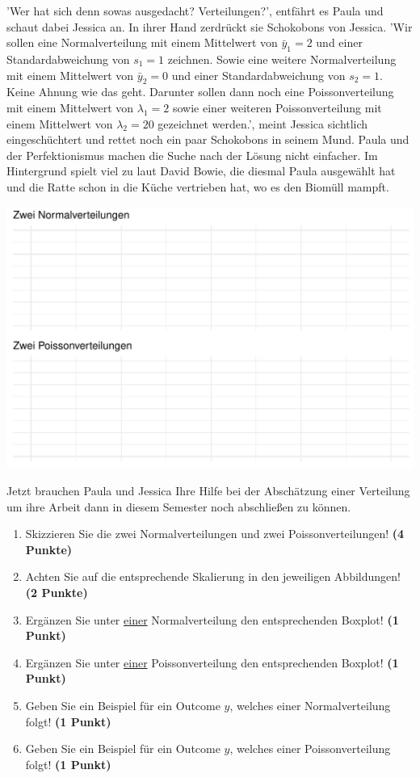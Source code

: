 \documentclass[a4paper, 9pt]{scrartcl}\usepackage[]{graphicx}\usepackage[]{xcolor}
\makeatletter
\def\maxwidth{ %
  \ifdim\Gin@nat@width>\linewidth
    \linewidth
  \else
    \Gin@nat@width
  \fi
}
\makeatother
\begin{document}
'Wer hat sich denn sowas ausgedacht? Verteilungen?', entfährt es Paula und schaut dabei Jessica an. In ihrer Hand zerdrückt sie Schokobons von Jessica. 'Wir sollen eine Normalverteilung mit einem Mittelwert von $\bar{y}_1 = 2$ und einer Standardabweichung von $s_1 = 1$ zeichnen. Sowie eine weitere Normalverteilung mit einem Mittelwert von $\bar{y}_2 = 0$ und einer Standardabweichung von $s_2 = 1$. Keine Ahnung wie das geht. Darunter sollen dann noch eine Poissonverteilung mit einem Mittelwert von $\lambda_1 = 2$ sowie einer weiteren Poissonverteilung mit einem Mittelwert von $\lambda_2 = 20$ gezeichnet werden.', meint Jessica sichtlich eingeschüchtert und rettet noch ein paar Schokobons in seinem Mund. Paula und der Perfektionismus machen die Suche nach der Lösung nicht einfacher. Im Hintergrund spielt viel zu laut David Bowie, die diesmal Paula ausgewählt hat und die Ratte schon in die Küche vertrieben hat, wo es den Biomüll mampft.\\




{\centering \includegraphics[width=\maxwidth]{img/histogram-01-1} 

}




Jetzt brauchen Paula und Jessica Ihre Hilfe bei der Abschätzung einer Verteilung um ihre Arbeit dann in diesem Semester noch abschließen zu können.


\begin{enumerate}
\item Skizzieren Sie die zwei Normalverteilungen und zwei Poissonverteilungen! \textbf{(4 Punkte)}
\item Achten Sie auf die entsprechende Skalierung in den jeweiligen Abbildungen! \textbf{(2 Punkte)}
\item Ergänzen Sie unter \underline{einer} Normalverteilung den entsprechenden Boxplot! \textbf{(1 Punkt)}
\item Ergänzen Sie unter \underline{einer} Poissonverteilung den entsprechenden Boxplot! \textbf{(1 Punkt)}
\item Geben Sie ein Beispiel für ein Outcome $y$, welches einer Normalverteilung folgt! \textbf{(1 Punkt)}
\item Geben Sie ein Beispiel für ein Outcome $y$, welches einer Poissonverteilung folgt! \textbf{(1 Punkt)}
\end{enumerate} 
\clearpage
\end{document}
